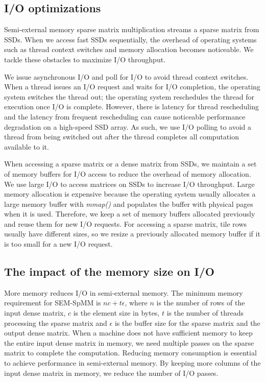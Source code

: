 \subsection{I/O optimizations}
Semi-external memory sparse matrix multiplication streams a sparse matrix from
SSDs. When we access fast SSDs sequentially, the overhead of operating systems
such as thread context switches and memory allocation becomes noticeable.
We tackle these obstacles to maximize I/O throughput.

We issue asynchronous I/O and poll for I/O to avoid thread
context switches. %
When a thread issues an I/O request and waits for I/O completion,
the operating system switches the thread
out; the operating system reschedules the thread for execution once I/O is
complete. However, there is latency for thread rescheduling and the latency
from frequent rescheduling can cause noticeable performance degradation
on a high-speed SSD array. As such, we use I/O polling to avoid a thread from
being switched out after the thread completes all computation available to it.

When accessing a sparse matrix or a dense matrix from SSDs, we maintain a set of
memory buffers for I/O access to reduce the overhead of memory allocation.
We use large I/O to access matrices on SSDs to increase I/O throughput.
Large memory allocation is expensive because the operating
system usually allocates a large memory buffer with \textit{mmap()} and
populates the buffer with physical pages when it is used. Therefore, we keep
a set of memory buffers allocated previously and reuse them for new I/O requests.
For accessing a sparse matrix, tile rows usually have different sizes, so we resize
a previously allocated memory buffer if it is too small for a new I/O request.

\subsection{The impact of the memory size on I/O}
\label{sec:spmm:mem}
More memory reduces I/O in semi-external memory. The minimum memory requirement
for SEM-SpMM is $n c + t \epsilon$, where $n$ is the number of rows
of the input dense matrix, $c$ is the element size in bytes,
$t$ is the number of threads processing the sparse matrix
and $\epsilon$ is the buffer size for the sparse matrix and the output
dense matrix. When a machine does not have sufficient memory to keep the entire
input dense matrix in memory, we need multiple passes on the sparse matrix to
complete the computation. Reducing memory consumption is essential
to achieve performance in semi-external memory. By keeping more columns of
the input dense matrix in memory, we reduce the number of I/O passes.

